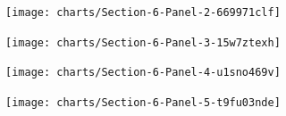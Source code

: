 \documentclass{article}
\begin{document}
\begin{figure}[!htb]
\texttt{[image: charts/Section-6-Panel-2-669971clf]}
\caption{}
\endminipage\hfill
{}
\texttt{[image: charts/Section-6-Panel-3-15w7ztexh]}
\caption{}
\endminipage
\end{figure}

\begin{figure}[!htb]
\texttt{[image: charts/Section-6-Panel-4-u1sno469v]}
\caption{}
\endminipage\hfill
{}
\texttt{[image: charts/Section-6-Panel-5-t9fu03nde]}
\caption{}
\endminipage
\end{figure}

\nocite{*}


\end{document}
